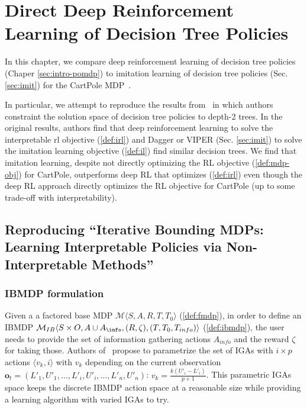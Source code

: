 \chapter{Direct Deep Reinforcement Learning of Decision Tree Policies}\label{sec:topin}
In this chapter, we compare deep reinforcement learning of decision tree policies (Chaper \ref{sec:intro-pomdp}) to imitation learning of decision tree policies (Sec. \ref{sec:imit}) for the CartPole MDP~\cite{cartpole}.

In particular, we attempt to reproduce the results from~\cite[Table 1]{topin2021iterative} in which authors constraint the solution space of decision tree policies to depth-2 trees.
In the original results, authors find that deep reinforcement learning to solve the interpretable rl objective (\ref{def:irl}) and Dagger or VIPER (Sec. \ref{sec:imit}) to solve the imitation learning objective (\ref{def:il}) find similar decision trees.
We find that imitation learning, despite not directly optimizing the RL objective (\ref{def:mdp-obj}) for CartPole, outperforms deep RL that optimizes (\ref{def:irl}) even though the deep RL approach directly optimizes the RL objective for CartPole (up to some trade-off with interpretability).
\section{Reproducing ``Iterative Bounding MDPs: Learning Interpretable Policies via Non-Interpretable Methods''}

\subsection{IBMDP formulation}
Given a a factored base MDP $\mathcal{M}\langle S, A, R, T, T_0\rangle$ (\ref{def:fmdp}), in order to define an IBMDP $\mathcal{M}_{IB}\langle S\times O, A\cup A_{\info}, (R, \zeta),( T, T_0, T_{info})\rangle$ (\ref{def:ibmdp}), the user needs to provide the set of information gathering actions $A_{info}$ and the reward $\zeta$ for taking those.
Authors of~\cite{topin2021iterative} propose to parametrize the set of IGAs with $i \times p$ actions $\langle v_k, i \rangle$ with $v_k$ depending on the current observation $\boldsymbol{o}_t=(L'_1, U'_1, \dots, L'_i, U'_i, \dots, L'_n, U'_n)$: $v_k = \frac{k(U'_i - L'_i)}{p+1}$.
This parametric IGAs space keeps the discrete IBMDP action space at a reasonable size while providing a learning algorithm with varied IGAs to try.

